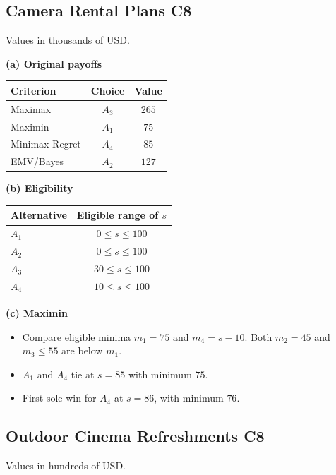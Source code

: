 {\small
\subsection{Camera Rental Plans \hfill C8}
\noindent Values in thousands of USD.

\noindent\begin{minipage}[t]{0.35\textwidth}
  \vspace{0pt}
  \textbf{(a) Original payoffs}\par\smallskip
  \setlength{\tabcolsep}{3pt}
  \begin{tabular}{@{}lcc@{}}
    \toprule
    Criterion & Choice & Value\\ \midrule
    Maximax & $A_3$ & $265$\\
    Maximin & $A_1$ & $75$\\
    Minimax Regret & $A_4$ & $85$\\
    EMV/Bayes & $A_2$ & $127$\\
    \bottomrule
  \end{tabular}
\end{minipage}\hfill
\begin{minipage}[t]{0.62\textwidth}
  \vspace{0pt}
  \textbf{(b) Eligibility}\par\smallskip
  \begin{tabular}{@{}lc@{}}
    \toprule
    Alternative & Eligible range of $s$\\ \midrule
    $A_1$ & $0\le s\le100$\\
    $A_2$ & $0\le s\le100$\\
    $A_3$ & $30\le s\le100$\\
    $A_4$ & $10\le s\le100$\\
    \bottomrule
  \end{tabular}\par\smallskip
  \textbf{(c) Maximin}
  \begin{itemize}[leftmargin=*,nosep]
    \item Compare eligible minima $m_1=75$ and $m_4=s-10$. Both $m_2=45$ and $m_3\le55$ are below $m_1$.
    \item $A_1$ and $A_4$ tie at $s=85$ with minimum $75$.
    \item First sole win for $A_4$ at $\boxed{s=86}$, with minimum $76$.
  \end{itemize}
\end{minipage}

\subsection{Outdoor Cinema Refreshments \hfill C8}
\noindent Values in hundreds of USD.

}
